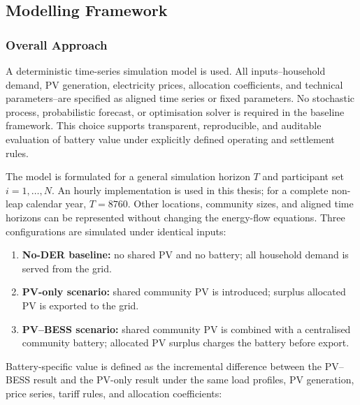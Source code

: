 
\subsection{Modelling Framework}
\label{sec:modelling_framework}

\subsubsection{Overall Approach}
\label{subsec:overall_approach}

A deterministic time-series simulation model is used. All inputs--household demand, PV generation, electricity prices, allocation coefficients, and technical parameters--are specified as aligned time series or fixed parameters. No stochastic process, probabilistic forecast, or optimisation solver is required in the baseline framework. This choice supports transparent, reproducible, and auditable evaluation of battery value under explicitly defined operating and settlement rules.

The model is formulated for a general simulation horizon $T$ and participant set $i=1,\ldots,N$. An hourly implementation is used in this thesis; for a complete non-leap calendar year, $T=8760$. Other locations, community sizes, and aligned time horizons can be represented without changing the energy-flow equations. Three configurations are simulated under identical inputs:

\begin{enumerate}
    \item \textbf{No-DER baseline:} no shared PV and no battery; all household demand is served from the grid.
    \item \textbf{PV-only scenario:} shared community PV is introduced; surplus allocated PV is exported to the grid.
    \item \textbf{PV--BESS scenario:} shared community PV is combined with a centralised community battery; allocated PV surplus charges the battery before export.
\end{enumerate}

Battery-specific value is defined as the incremental difference between the PV--BESS result and the PV-only result under the same load profiles, PV generation, price series, tariff rules, and allocation coefficients:

